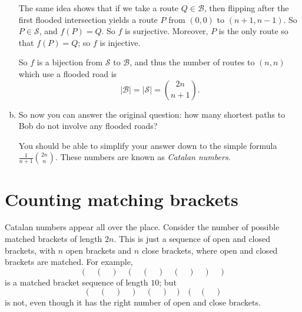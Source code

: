 \documentclass[12pt]{article}
\newcommand{\Bob}{\mathcal{B}}
\newcommand{\Sandy}{\mathcal{S}}
\begin{document}
\begin{enumerate}[(a)]
{            The same idea shows that if we take a route $Q \in \Bob$, then flipping after the first flooded intersection yields a route $P$ from $(0,0)$ to $(n+1,n-1)$. So $P \in \Sandy$, and $f(P) = Q$. So $f$ is surjective. Moreover, $P$ is the only route so that $f(P)=Q$; so $f$ is injective.

            So $f$ is a bijection from $\Sandy$ to $\Bob$, and thus the number of routes to $(n,n)$ which use a flooded road is
            \[ |\Bob| = |\Sandy| = {2n \choose n+1}. \]
        }
        \newpage

\item So now you can answer the original question: how many shortest paths to Bob do not involve any flooded roads? 

    You should be able to simplify your answer down to the simple formula $\frac{1}{n+1}{2n \choose n}$. These numbers are known as \emph{Catalan numbers}.


\end{enumerate}

\section*{Counting matching brackets} 

Catalan numbers appear all over the place. Consider the number of possible matched brackets of length $2n$. 
This is just a sequence of open and closed brackets, with $n$ open brackets and $n$ close brackets, where open and closed brackets are matched. 
For example, 
\[ ( \quad ( \quad ) \quad ( \quad ( \quad ) \quad ( \quad ) \quad ) \quad ) \]
is a matched bracket sequence of length $10$; but
\[ ( \quad ( \quad ) \quad ) \quad ( \quad ) \quad ) \quad ( \quad ( \quad ) \]
is not, even though it has the right number of open and close brackets.
\end{document}
